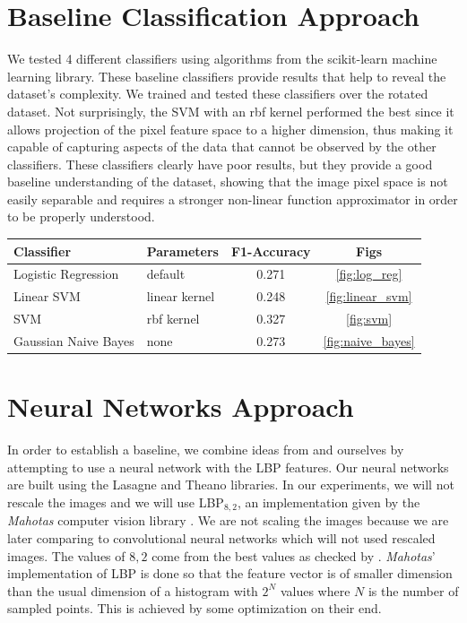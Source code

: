 \begin{multicols}{2}
\section{Baseline Classification Approach}
We tested 4 different classifiers using algorithms from the scikit-learn \citet{scikit-learn} machine learning library. These baseline classifiers provide results that help to reveal the dataset's complexity. We trained and tested these classifiers over the rotated dataset. Not surprisingly, the SVM with an rbf kernel performed the best since it allows projection of the pixel feature space to a higher dimension, thus making it capable of capturing aspects of the data that cannot be observed by the other classifiers. These classifiers clearly have poor results, but they provide a good baseline understanding of the dataset, showing that the image pixel space is not easily separable and requires a stronger non-linear function approximator in order to be properly understood.

\begin{tabular}{llcc}
\toprule
\textbf{Classifier} & \textbf{Parameters} & \textbf{F1-Accuracy} & \textbf{Figs}\\ \midrule
Logistic Regression  & default         & 0.271 & \ref{fig:log_reg}\\ 
Linear SVM   	     & linear kernel   & 0.248 & \ref{fig:linear_svm}\\
SVM                  & rbf kernel      & 0.327 & \ref{fig:svm}\\
Gaussian Naive Bayes & none            & 0.273 & \ref{fig:naive_bayes}\\ \bottomrule
\end{tabular}

\section{Neural Networks Approach}
In order to establish a baseline, we combine ideas from \citet{kylberg2011virus} and ourselves by attempting to use a neural network with the LBP features. Our neural networks are built using the Lasagne and Theano \cite{Bastien-Theano-2012, bergstra+al:2010-scipy} libraries. In our experiments, we will not rescale the images and we will use LBP$_{8,2}$, an implementation given by the \emph{Mahotas} computer vision library \citet{coelho2012mahotas}. We are not scaling the images because we are later comparing to convolutional neural networks which will not used rescaled images. The values of $8,2$ come from the best values as checked by \citet{kylberg2011virus}. \emph{Mahotas}' implementation of LBP is done so that the feature vector is of smaller dimension than the usual dimension of a histogram with $2^N$ values where $N$ is the number of sampled points. This is achieved by some optimization on their end. 

\end{multicols}
